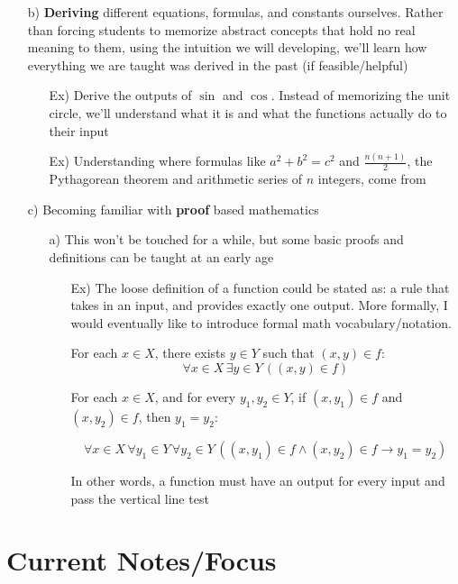\documentclass[hidelinks]{article}
\begin{document}
\begin{itemize}
    \item[b)] \textbf{Deriving} different equations, formulas, and constants ourselves. Rather than forcing students to memorize abstract concepts that hold no real meaning to them, using the intuition we will developing, we'll learn how everything we are taught was derived in the past (if feasible/helpful)
    \begin{itemize}
        \item[Ex)] Derive the outputs of $\sin$ and $\cos$. Instead of memorizing the unit circle, we'll understand what it is and what the functions actually do to their input 
        \item[Ex)] Understanding where formulas like $a^2 + b^2 = c^2 $ and $\frac{n(n+1)}{2}$, the Pythagorean theorem and arithmetic series of $n$ integers, come from
    \end{itemize}

    \item[c)] Becoming familiar with \textbf{proof} based mathematics
    \begin{itemize}
        \item[a)] This won't be touched for a while, but some basic proofs and definitions can be taught at an early age
        \begin{itemize}
            \item[Ex)] The loose definition of a function could be stated as: a rule that takes in an input, and provides exactly one output. More formally, I would eventually like to introduce formal math vocabulary/notation. 
                \vspace{0.2cm}

For each \( x \in X \), there exists \( y \in Y \) such that \( (x, y) \in f \):
\[
\forall x \in X \, \exists y \in Y \, ((x, y) \in f)
\]

For each \( x \in X \), and for every \( y_1, y_2 \in Y \), if \( (x, y_1) \in f \) and \( (x, y_2) \in f \), then \( y_1 = y_2 \):

\[
\forall x \in X \, \forall y_1 \in Y \, \forall y_2 \in Y \, \left( (x, y_1) \in f \land (x, y_2) \in f \to y_1 = y_2 \right)
\]
        \item[ ] In other words, a function must have an output for every input and pass the vertical line test
        \end{itemize}
    \end{itemize}
\end{itemize}
\newpage
\section*{Current Notes/Focus}
\end{document}
